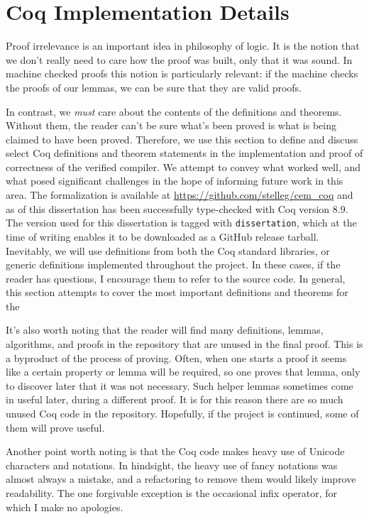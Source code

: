 \chapter{Coq Implementation Details}

Proof irrelevance is an important idea in philosophy of logic. It is the notion
that we don't really need to care how the proof was built, only that it was
sound. In machine checked proofs this notion is particularly relevant: if the
machine checks the proofs of our lemmas, we can be sure that they are valid
proofs.

In contrast, we \emph{must} care about the contents of the definitions and
theorems. Without them, the reader can't be sure what's been proved is what is
being claimed to have been proved. Therefore, we use this section to define and
discuss select Coq definitions and theorem statements in the implementation and
proof of correctness of the verified compiler. We attempt to convey what worked
well, and what posed significant challenges in the hope of informing future work
in this area. The formalization is available at
\url{https://github.com/stelleg/cem\_coq} and as of this dissertation has been
successfully type-checked with Coq version 8.9.  The version used for this
dissertation is tagged with \texttt{dissertation}, which at the time of writing
enables it to be downloaded as a GitHub release tarball. Inevitably, we will use
definitions from both the Coq standard libraries, or generic definitions
implemented throughout the project. In these cases, if the reader has questions,
I encourage them to refer to the source code. In general, this section attempts
to cover the most important definitions and theorems for the 

It's also worth noting that the reader will find many definitions, lemmas,
algorithms, and proofs in the repository that are unused in the final proof.
This is a byproduct of the process of proving. Often, when one starts a proof it
seems like a certain property or lemma will be required, so one proves that
lemma, only to discover later that it was not necessary. Such helper lemmas
sometimes come in useful later, during a different proof. It is for this reason
there are so much unused Coq code in the repository. Hopefully, if the project
is continued, some of them will prove useful.

Another point worth noting is that the Coq code makes heavy use of Unicode
characters and notations. In hindsight, the heavy use of fancy notations was
almost always a mistake, and a refactoring to remove them would likely improve
readability. The one forgivable exception is the occasional infix operator, for
which I make no apologies.

